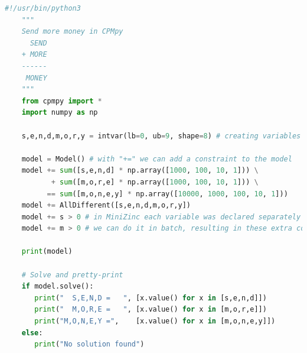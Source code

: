 \begin{lstlisting}[language=python, label={lst:SendMoreMoneyCPMpy},  caption={Solution to the puzzle “send more money”. Modified from the example in the CPMpy repository \url{https://github.com/CPMpy/cpmpy/blob/master/examples/send_more_money.py}}]
	#!/usr/bin/python3
	"""
	Send more money in CPMpy
	  SEND
	+ MORE
	------
	 MONEY
	"""
	from cpmpy import *
	import numpy as np
	
	s,e,n,d,m,o,r,y = intvar(lb=0, ub=9, shape=8) # creating variables
	
	model = Model() # with "+=" we can add a constraint to the model
	model += sum([s,e,n,d] * np.array([1000, 100, 10, 1])) \
	       + sum([m,o,r,e] * np.array([1000, 100, 10, 1])) \
	      == sum([m,o,n,e,y] * np.array([10000, 1000, 100, 10, 1]))
	model += AllDifferent([s,e,n,d,m,o,r,y])
	model += s > 0 # in MiniZinc each variable was declared separately in CPMpy 
	model += m > 0 # we can do it in batch, resulting in these extra constraints 
	
	print(model)
	
	# Solve and pretty-print
	if model.solve():
	   print("  S,E,N,D =   ", [x.value() for x in [s,e,n,d]])
	   print("  M,O,R,E =   ", [x.value() for x in [m,o,r,e]])
	   print("M,O,N,E,Y =",    [x.value() for x in [m,o,n,e,y]])
	else:
	   print("No solution found")
\end{lstlisting}



